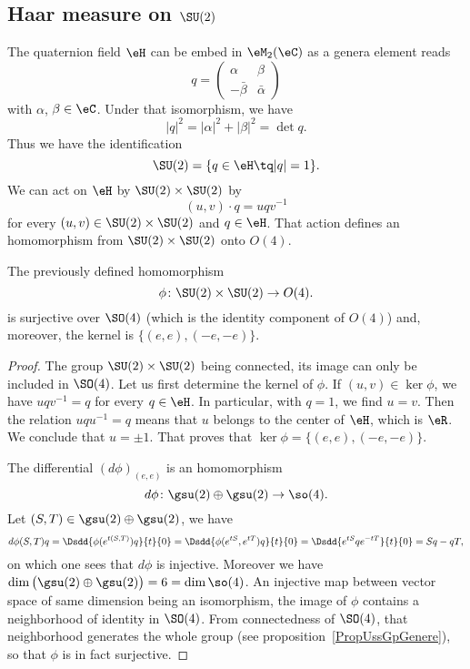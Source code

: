 \subsection{Haar measure on \texorpdfstring{$\SU(2)$}{SU2}}

The quaternion field $\eH$ can be embed in $\eM_2(\eC)$ as a genera element reads
\begin{equation}
	q=
	\begin{pmatrix}
		\alpha     & \beta      \\
		-\bar\beta & \bar\alpha
	\end{pmatrix}
\end{equation}
with $\alpha$, $\beta\in\eC$. Under that isomorphism, we have
\[
	| q |^2=| \alpha |^2+| \beta |^2=\det q.
\]
Thus we have the identification
\begin{equation}
	\SU(2)=\{ q\in\eH\tq | q |=1 \}.
\end{equation}
We can act on $\eH$ by $\SU(2)\times \SU(2)$ by
\begin{equation}
	(u,v)\cdot q=uqv^{-1}
\end{equation}
for every $(u,v)\in \SU(2)\times\SU(2)$ and $q\in\eH$. That action defines an homomorphism from $\SU(2)\times\SU(2)$ onto $O(4)$.

\begin{proposition}
	The previously defined homomorphism
	\[
		\phi\colon \SU(2)\times\SU(2)\to O(4).
	\]
	is surjective over $\SO(4)$ (which is the identity component of $O(4)$) and, moreover, the kernel is $\big\{  (e,e),(-e,-e) \big\}$.
\end{proposition}

\begin{proof}
	The group $\SU(2)\times \SU(2)$ being connected, its image can only be included in $\SO(4)$. Let us first determine the kernel of $\phi$. If $(u,v)\in\ker\phi$, we have $uqv^{-1}=q$ for every $q\in\eH$. In particular, with $q=1$, we find $u=v$. Then the relation $uqu^{-1}=q$ means that $u$ belongs to the center of $\eH$, which is $\eR$. We conclude that $u=\pm 1$. That proves that $\ker\phi=\big\{  (e,e),(-e,-e) \big\}$.

	The differential $(d\phi)_{(e,e)}$ is an homomorphism
	\[
		d\phi\colon \gsu(2)\oplus\gsu(2)\to \so(4).
	\]
	Let $(S,T)\in\gsu(2)\oplus\gsu(2)$, we have
	\[
		d\phi(S,T)q=\Dsdd{ \phi( e^{t(S,T)})q }{t}{0}=\Dsdd{ \phi( e^{tS}, e^{tT})q }{t}{0}=\Dsdd{  e^{tS}q e^{-tT} }{t}{0}=Sq-qT,
	\]
	on which one sees that $d\phi$ is injective. Moreover we have $\dim\big( \gsu(2)\oplus\gsu(2) \big)=6=\dim\so(4)$. An injective map between vector space of same dimension being an isomorphism, the image of $\phi$ contains a neighborhood of identity in $\SO(4)$. From connectedness of $\SO(4)$, that neighborhood generates the whole group (see proposition~\ref{PropUssGpGenere}), so that $\phi$ is in fact surjective.
\end{proof}

